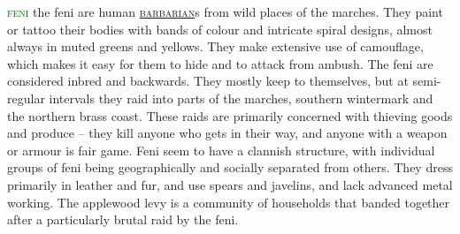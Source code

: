 \documentclass[twoside,11pt,b5paper,twocolumn]{scrbook}
\newcommand{\estcab}[1]{\textsc{\textcolor{marron}{#1}}}
\renewcommand{\paragraph}[1]{\par\noindent\markboth{#1}{#1}\estcab{\textcolor{darkgreen}{#1}}\label{#1} }
\newcommand{\see}[1]{{\estcab{\hyperref[#1]{#1}}}}
\begin{document}
\paragraph{feni} the feni are human \see{barbarian}s from wild places of the marches. They paint or tattoo their bodies with bands of colour and intricate spiral designs, almost always in muted greens and yellows. They make extensive use of camouflage, which makes it easy for them to hide and to attack from ambush. The feni are considered inbred and backwards. They mostly keep to themselves, but at semi-regular intervals they raid into parts of the marches, southern wintermark and the northern brass coast. These raids are primarily concerned with thieving goods and produce – they kill anyone who gets in their way, and anyone with a weapon or armour is fair game. Feni seem to have a clannish structure, with individual groups of feni being geographically and socially separated from others. They dress primarily in leather and fur, and use spears and javelins, and lack advanced metal working. The applewood levy is a community of households that banded together after a particularly brutal raid by the feni.
\end{document}
